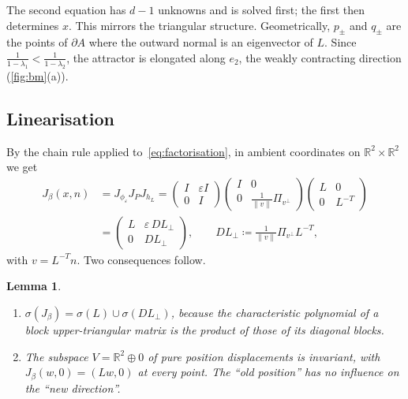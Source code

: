 \documentclass[11pt,a4paper]{article}
\newtheorem{lemma}[theorem]{Lemma}
\theoremstyle{definition}
\theoremstyle{remark}
\newcommand{\R}{\mathbb{R}}
\newcommand{\eps}{\varepsilon}
\newcommand{\Lperp}{L_\perp}
\begin{document}
The second equation has $d-1$ unknowns and is solved first; the first then determines $x$. This mirrors the triangular
structure. Geometrically, $p_\pm$ and $q_\pm$ are the points of $\partial A$ where the outward normal is an
eigenvector of $L$. Since $\frac{1}{1-\lambda_1}<\frac{1}{1-\lambda_2}$, the attractor is elongated along $e_2$, the
weakly contracting direction (\cref{fig:bm}(a)).

\subsection{Linearisation}
By the chain rule applied to~\eqref{eq:factorisation}, in ambient coordinates on $\R^2\times\R^2$ we get
\begin{equation}\label{eq:jacobian}
\begin{aligned}
  J_\beta(x,n)&=J_{\phi_\eps}J_PJ_{h_L}
  =\begin{pmatrix} I&\eps I\\0&I\end{pmatrix}\begin{pmatrix} I&0\\0&\tfrac{1}{\|v\|}\Pi_{v^\perp}\end{pmatrix}
   \begin{pmatrix} L&0\\0&L^{-T}\end{pmatrix}\\
  &=\begin{pmatrix} L&\eps\,D\Lperp\\0&D\Lperp\end{pmatrix},
  \qquad D\Lperp\coloneqq\tfrac{1}{\|v\|}\Pi_{v^\perp}L^{-T},
\end{aligned}
\end{equation}
with $v=L^{-T}n$. Two consequences follow.

\begin{lemma}\label{lem:triangular}
\begin{enumerate}[label=(\roman*)]
  \item $\sigma(J_\beta)=\sigma(L)\cup\sigma(D\Lperp)$, because the characteristic polynomial of a block
  upper-triangular matrix is the product of those of its diagonal blocks.
  \item The subspace $V=\R^2\oplus0$ of pure position displacements is invariant, with $J_\beta(w,0)=(Lw,0)$ at
  \emph{every} point. The ``old position'' has no influence on the ``new direction''.
\end{enumerate}
\end{lemma}
\end{document}
